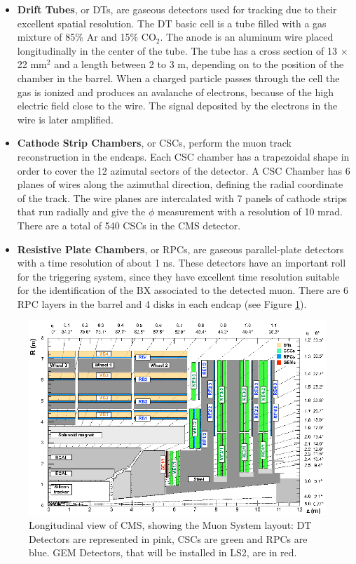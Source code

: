 \begin{itemize} 
 \item \textbf{Drift Tubes}, or DTs, are gaseous detectors used for tracking due to their excellent spatial resolution.
The DT basic cell is a tube filled with a gas mixture of 85$\%$ Ar and 15$\%$ CO$_{2}$.
The anode is an aluminum wire placed longitudinally in the center of the tube.
The tube has a cross section of 13 $\times$ 22 mm$^{2}$ and a length between 2 to 3 m,
depending on to the position of the chamber in the barrel. When a charged particle passes through the cell 
the gas is ionized and produces an avalanche of electrons, because of the high 
electric field close to the wire. The signal deposited by the electrons in the wire is later amplified. 
 \item \textbf{Cathode Strip Chambers}, or CSCs, perform the muon track reconstruction in the endcaps. Each CSC chamber
has a trapezoidal shape in order to cover the 12 azimutal sectors of the detector. A CSC Chamber 
has 6 planes of wires along the azimuthal direction, defining the radial coordinate of the track. The wire
planes are intercalated with 7 panels of cathode strips that run radially and give the $\phi$ measurement 
with a resolution of 10 mrad. There are a total of 540 CSCs in the CMS detector. %
\item \textbf{Resistive Plate Chambers}, or RPCs, are gaseous parallel-plate detectors 
with a time resolution of about 1 ns. These detectors have an important roll for the triggering
system, since they have excellent time resolution suitable for the identification of the BX 
associated to the detected muon. There are 6 RPC layers in the barrel
and 4 disks in each endcap (see Figure \ref{figchp2:MuonSystem}). 
 \end{itemize}


\begin{center}
\begin{figure}[h]
\centering
\includegraphics[scale=0.4]{figuras/Chapter2/MuonSystem}
\caption{Longitudinal view of CMS, showing the Muon System layout: DT Detectors are represented in pink,
CSCs are green and RPCs are blue. GEM Detectors, that will be installed in LS2, are in red.}\label{figchp2:MuonSystem}
\end{figure}
\end{center}

